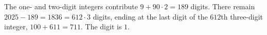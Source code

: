 The one- and two-digit integers contribute $9+90\cdot2=189$ digits. There remain $2025-189=1836=612\cdot3$ digits, ending at the last digit of the $612$th three-digit integer, $100+611=711$. The digit is $\boxed1$.
